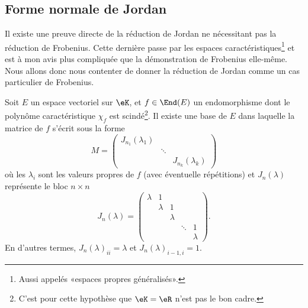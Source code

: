 \subsection{Forme normale de Jordan}

Il existe une preuve directe de la réduction de Jordan ne nécessitant pas la réduction de Frobenius\cite{LecLinAlgAllen}. Cette dernière passe par les espaces caractéristiques\footnote{Aussi appelés «espaces propres généralisés».} et est à mon avis plus compliquée que la démonstration de Frobenius elle-même. Nous allons donc nous contenter de donner la réduction de Jordan comme un cas particulier de Frobenius.

\begin{theorem}
    Soit \( E\) un espace vectoriel sur \( \eK\), et \( f\in\End(E)\) un endomorphisme dont le polynôme caractéristique \( \chi_f\) est scindé\footnote{C'est pour cette hypothèse que \( \eK=\eR\) n'est pas le bon cadre.}. Il existe une base de \( E\) dans laquelle la matrice de \( f\) s'écrit sous la forme
    \begin{equation}
        M=\begin{pmatrix}
            J_{n_1}(\lambda_1)    &       &       \\
                &   \ddots    &       \\
                &       &   J_{n_k}(\lambda_k)
        \end{pmatrix}
    \end{equation}
    où les \( \lambda_i\) sont les valeurs propres de \( f\) (avec éventuelle répétitions) et \( J_n(\lambda)\) représente le bloc \( n\times n\)
    \begin{equation}
        J_n(\lambda)=\begin{pmatrix}
            \lambda    &   1    &       &       &   \\  
                &   \lambda    &   1    &       &   \\  
                &       &   \lambda    &       &   \\  
                &       &       &   \ddots    &   1\\  
                &       &       &       &   \lambda    
        \end{pmatrix}.
    \end{equation}
    En d'autres termes, \( J_n(\lambda)_{ii}=\lambda\) et \( J_n(\lambda)_{i-1,i}=1\).    
\end{theorem}

